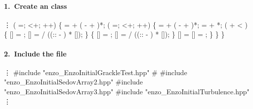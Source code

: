 
\begin{frame}[fragile] 
\secframetitle{\ssDevelInitial}
\framesubtitle{1.~Create an  class}
\scriptsize
\begin{semiverbatim}
      \vdots
    ( =; <+; ++) \{
        =  + ( -  + )*;
       ( =; <+; ++) \{
           =  + ( -  + )*;
           =  + *;
          ( +  < ) \{
            []  = ;
            [] =  / ((:: - ) * []);
         \}  \{
            []  = ;
            [] =  / ((:: - ) * []);
         \}
         [] = [] = ;
      \}
   \}
\}
\end{semiverbatim}
\end{frame}


\begin{frame}[fragile] 
\secframetitle{\ssDevelInitial}
\framesubtitle{2.~Include the  file}

%
\begin{semiverbatim}
       \vdots
   #include "enzo_EnzoInitialGrackleTest.hpp"
   # 
   #include "enzo_EnzoInitialSedovArray2.hpp"
   #include "enzo_EnzoInitialSedovArray3.hpp"
   #include "enzo_EnzoInitialTurbulence.hpp"
       \vdots
\end{semiverbatim}


\end{frame}

